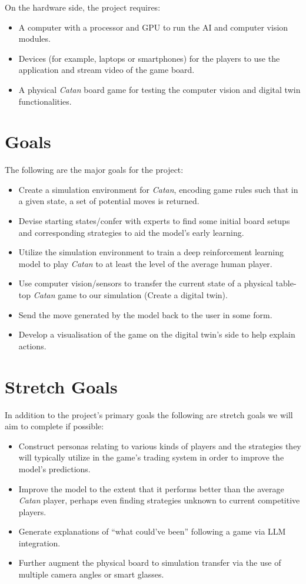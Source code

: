 \documentclass{article}
\begin{document}
On the hardware side, the project requires:
\begin{itemize}
    \item A computer with a processor and GPU to run the AI and computer vision modules.
    \item Devices (for example, laptops or smartphones) for the players to use the application and stream video of the game board.
    \item A physical \emph{Catan} board game for testing the computer vision and digital twin functionalities.
\end{itemize}

\section{Goals}\label{sec:goals}
The following are the major goals for the project:
\begin{itemize}
    \item Create a simulation environment for \emph{Catan}, encoding game rules such that in a given state, a set of potential moves is returned.
    \item Devise starting states/confer with experts to find some initial board setups and corresponding strategies to aid the model’s early learning.
    \item Utilize the simulation environment to train a deep reinforcement learning model to play \emph{Catan} to at least the level of the average human player.
    \item Use computer vision/sensors to transfer the current state of a physical table-top \emph{Catan} game to our simulation (Create a digital twin).
    \item Send the move generated by the model back to the user in some form.
    \item Develop a visualisation of the game on the digital twin’s side to help explain actions.
\end{itemize}

\section{Stretch Goals}\label{sec:stretch-goals}
In addition to the project’s primary goals the following are stretch goals we will aim to complete if possible:
\begin{itemize}
    \item Construct personas relating to various kinds of players and the strategies they will typically utilize in the game’s trading system in order to improve the model’s predictions.
    \item Improve the model to the extent that it performs better than the average \emph{Catan} player, perhaps even finding strategies unknown to current competitive players.
    \item Generate explanations of “what could’ve been” following a game via LLM integration.
    \item Further augment the physical board to simulation transfer via the use of multiple camera angles or smart glasses.
\end{itemize}
\end{document}

